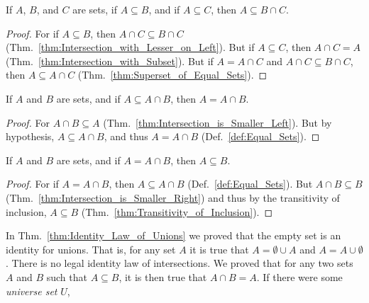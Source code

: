         \begin{theorem}
            \label{thm:Intersection_of_Supersets_is_Still_Superset}%
            If $A$, $B$, and $C$ are sets, if $A\subseteq{B}$, and if
            $A\subseteq{C}$, then $A\subseteq{B}\cap{C}$.
        \end{theorem}
        \begin{proof}
            For if $A\subseteq{B}$, then $A\cap{C}\subseteq{B}\cap{C}$
            (Thm.~\ref{thm:Intersection_with_Lesser_on_Left}). But if
            $A\subseteq{C}$, then $A\cap{C}=A$
            (Thm.~\ref{thm:Intersection_with_Subset}). But if $A=A\cap{C}$
            and $A\cap{C}\subseteq{B}\cap{C}$, then $A\subseteq{A}\cap{C}$
            (Thm.~\ref{thm:Superset_of_Equal_Sets}).
        \end{proof}
        \begin{theorem}
            \label{thm:Conv_Intersection_with_Subset}%
            If $A$ and $B$ are sets, and if $A\subseteq{A}\cap{B}$, then
            $A=A\cap{B}$.
        \end{theorem}
        \begin{proof}
            For $A\cap{B}\subseteq{A}$
            (Thm.~\ref{thm:Intersection_is_Smaller_Left}). But by hypothesis,
            $A\subseteq{A}\cap{B}$, and thus $A=A\cap{B}$
            (Def.~\ref{def:Equal_Sets}).
        \end{proof}
        \begin{theorem}
            \label{thm:Intersection_is_Equal}%
            If $A$ and $B$ are sets, and if $A=A\cap{B}$, then $A\subseteq{B}$.
        \end{theorem}
        \begin{proof}
            For if $A=A\cap{B}$, then $A\subseteq{A}\cap{B}$
            (Def.~\ref{def:Equal_Sets}). But $A\cap{B}\subseteq{B}$
            (Thm.~\ref{thm:Intersection_is_Smaller_Right}) and thus by the
            transitivity of inclusion, $A\subseteq{B}$
            (Thm.~\ref{thm:Transitivity_of_Inclusion}).
        \end{proof}
        In Thm.~\ref{thm:Identity_Law_of_Unions} we proved that the empty set is
        an identity for unions. That is, for any set $A$ it is true that
        $A=\emptyset\cup{A}$ and $A=A\cup\emptyset$. There is no legal identity
        law of intersections. We proved
        that for any two sets $A$ and $B$ such that $A\subseteq{B}$, it is then
        true that $A\cap{B}=A$. If there were some \textit{universe set} $U$,
